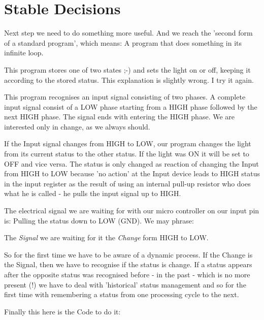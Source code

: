 \section{Stable Decisions}

Next step we need to do something more useful. And we reach the 'second form of a standard program', which means: A program that does something in its infinite loop.

This program stores one of two states ;-) and sets the light on or off, keeping it according to the stored status. This explanation is slightly wrong. I try it again.

This program recognises an input signal consisting of two phases. A complete input signal consist of a LOW phase starting from a HIGH phase followed by the next HIGH phase. The signal ends with entering the HIGH phase. We are interested only in change, as we always should.

If the Input signal changes from HIGH to LOW, our program changes the light from its current status to the other status. If the light was ON it will be set to OFF and vice versa. The status is only changed as reaction of changing the Input from HIGH to LOW because 'no action' at the Input device leads to HIGH status in the input register as the result of using an internal pull-up resistor who does what he is called - he pulls the input signal up to HIGH.

The electrical signal we are waiting for with our micro controller on our input pin is: Pulling the status down to LOW (GND). We may phrase:

\begin{center}
The \emph{Signal} we are waiting for it the \emph{Change} form HIGH to LOW.
\end{center}
 

So for the first time we have to be aware of a dynamic process. If the Change is the Signal, then we have to recognise if the status is change. If a status appears after the opposite status was recognised before - in the past - which is no more present (!) we have to deal with 'historical' status management and so for the first time with remembering a status from one processing cycle to the next.

Finally this here is the Code to do it:

